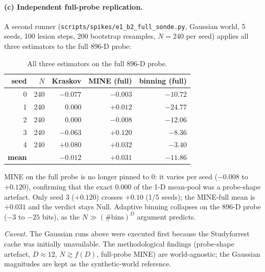 \documentclass{article}
\begin{document}
\paragraph{(c) Independent full-probe replication.}
A second runner (\texttt{scripts/spikes/e1\_b2\_full\_sonde.py},
Gaussian world, 5 seeds, 100 lesion steps, 200 bootstrap resamples,
$N = 240$ per seed) applies all three estimators to the full 896-D
probe:

\begin{table}[ht]
  \centering
  \caption{All three estimators on the full 896-D probe.}
  \label{tab:e1-fullsonde}
  \begin{tabular}{rrrrr}
    \toprule
    seed & $N$ & Kraskov & MINE (full) & binning (full) \\
    \midrule
    0 & 240 & $-0.077$ & $-0.003$ & $-10.72$ \\
    1 & 240 & $0.000$  & $+0.012$ & $-24.77$ \\
    2 & 240 & $0.000$  & $-0.008$ & $-12.06$ \\
    3 & 240 & $-0.063$ & $\mathbf{+0.120}$ & $-8.36$ \\
    4 & 240 & $+0.080$ & $+0.032$ & $-3.40$ \\
    \midrule
    \textbf{mean} & & $\mathbf{-0.012}$ & $\mathbf{+0.031}$ & $\mathbf{-11.86}$ \\
    \bottomrule
  \end{tabular}
\end{table}

MINE on the full probe is no longer pinned to $0$: it varies per seed
($-0.008$ to $+0.120$), confirming that the exact $0.000$ of the 1-D
mean-pool was a probe-shape artefact. Only seed 3 ($+0.120$) crosses
$+0.10$ (1/5 seeds); the MINE-full mean is $+0.031$ and the verdict
stays Null. Adaptive binning collapses on the 896-D probe ($-3$ to
$-25$ bits), as the $N \gg (\#\mathrm{bins})^D$ argument predicts.

\emph{Caveat.} The Gaussian runs above were executed first because the
Studyforrest cache was initially unavailable. The methodological
findings (probe-shape artefact, $D \approx 12$, $N \gtrsim f(D)$,
full-probe MINE) are world-agnostic; the Gaussian magnitudes are kept
as the synthetic-world reference.
\end{document}
